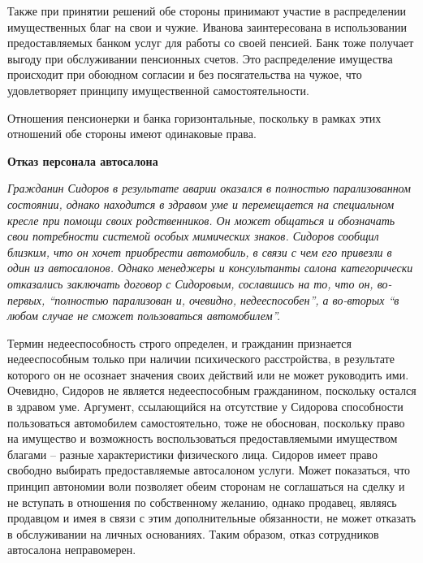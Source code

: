 \documentclass[a4paper, 12pt]{article}
\begin{document}
Также при принятии решений обе стороны принимают участие в распределении имущественных благ на свои и чужие. 
Иванова заинтересована в использовании предоставляемых банком услуг для работы со своей пенсией.
Банк тоже получает выгоду при обслуживании пенсионных счетов. 
Это распределение имущества происходит при обоюдном согласии и без посягательства на чужое, что удовлетворяет принципу имущественной самостоятельности. 

Отношения пенсионерки и банка горизонтальные, поскольку в рамках этих отношений обе стороны имеют одинаковые права. 


\newpage
\begin{center}\bf
Отказ персонала автосалона
\end{center}

\textit{Гражданин Сидоров в результате аварии оказался в полностью парализованном состоянии, однако находится в здравом уме и перемещается на специальном кресле при помощи своих родственников. 
Он может общаться и обозначать свои потребности системой особых мимических знаков.
Сидоров сообщил близким, что он хочет приобрести автомобиль, в связи с чем его привезли в один из автосалонов.
Однако менеджеры и консультанты салона категорически отказались заключать договор с Сидоровым, сославшись на то, что он, во-первых, ``полностью парализован и, очевидно, недееспособен'', а во-вторых ``в любом случае не сможет пользоваться автомобилем''.}

Термин недееспособность строго определен, и гражданин признается недееспособным только при наличии психического расстройства, в результате которого он не осознает значения своих действий или не может руководить ими. 
Очевидно, Сидоров не является недееспособным гражданином, поскольку остался в здравом уме. 
Аргумент, ссылающийся на отсутствие у Сидорова способности пользоваться автомобилем самостоятельно, тоже не обоснован, поскольку право на имущество и возможность воспользоваться предоставляемыми имуществом благами -- разные характеристики физического лица. 
Сидоров имеет право свободно выбирать предоставляемые автосалоном услуги. 
Может показаться, что принцип автономии воли позволяет обеим сторонам не соглашаться на сделку и не вступать в отношения по собственному желанию, однако продавец, являясь продавцом и имея в связи с этим дополнительные обязанности, не может отказать в обслуживании на личных основаниях. 
Таким образом, отказ сотрудников автосалона неправомерен. 
\end{document}
